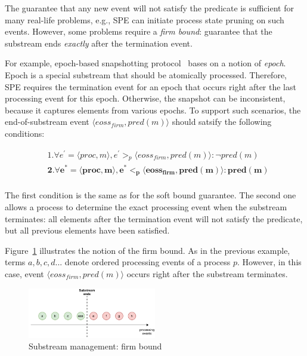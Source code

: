 The guarantee that any new event will not satisfy the predicate is sufficient for many real-life problems, e.g., SPE can initiate process state pruning on such events. However, some problems require a {\em firm bound}: guarantee that the substream ends {\em exactly} after the termination event. 

For example, epoch-based snapshotting protocol~\cite{2015arXiv150608603C, jacques2016consistent} bases on a notion of {\em epoch}. Epoch is a special substream that should be atomically processed. Therefore, SPE requires the termination event for an epoch that occurs right after the last processing event for this epoch. Otherwise, the snapshot can be inconsistent, because it captures elements from various epochs. To support such scenarios, the end-of-substream event $\langle eoss_{firm}, pred(m)\rangle$ should satsify the following conditions:

\begin{align*}
&1. \forall e^{'} = \langle proc,m\rangle, e^{'} >_p \langle eoss_{firm}, pred(m)\rangle : \neg pred(m) \\
&\boldsymbol{2. \forall e^{*} = \langle proc,m\rangle, e^{*} <_p \langle eoss_{firm}, pred(m)\rangle : pred(m)} \\
\end{align*}

The first condition is the same as for the soft bound guarantee. The second one allows a process to determine the exact processing event when the substream terminates: all elements after the termination event will not satisfy the predicate, but all previous elements have been satisfied. 

Figure~\ref{strict_guarantees} illustrates the notion of the firm bound. As in the previous example, terms $a,b,c,d...$ denote ordered processing events of a process $p$. However, in this case, event $\langle eoss_{firm}, pred(m)\rangle$ occurs right after the substream terminates.

\begin{figure}[htbp]
  \centering
  \includegraphics[width=0.50\textwidth]{pics/strict-guarantee.pdf}
  \caption{Substream management: firm bound}
  \label{strict_guarantees}
\end{figure}

